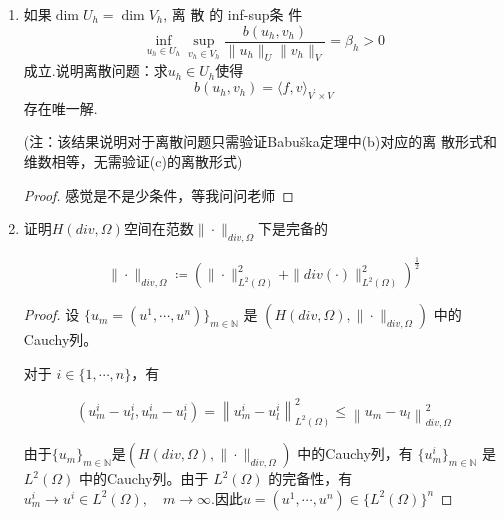 \documentclass[12pt,a4paper]{article}
\begin{document}
\begin{enumerate}
\begin{proof}
			在$\eqref{eq2}$中令$w=u$,则有
			$$\sup\limits_{v\in V}\frac{b(u,v)}{||v||_V}\geq\frac{b(u,\lambda)}{||\lambda||_V}=\frac{(u,u)}{||\lambda||_V}\geq\beta||u||_U,$$
			从而$B:U^{\perp}\to V^{\prime}$满足Babuška定理的三个条件，故$B$是一个同构映射.
			
			(3) $\Rightarrow$ (1):
			
			因 (3) 成立，故$B:U^\perp\to V^{\prime}$是一个同构，对给定的$v\in V$,
			$$\begin{aligned}||v||_{V}&=\sup_{g\in V^{\prime}}\frac{\langle g,v\rangle}{||g||_{V^{\prime}}}=\sup_{u\in U^{\perp}}\frac{\langle Bu,v\rangle}{||Bu||_{V^{\prime}}}\\&=\sup_{u\in U^{\perp}}\frac{b(u,v)}{||Bu||_{V^{\prime}}}\leq\sup_{u\in U^{\perp}}\frac{b(u,v)}{\beta||u||_{U}}\leq\frac{1}{\beta}\sup_{u\in U}\frac{b(u,v)}{||u||_{U}},\end{aligned}$$
			从而 (1)成立，证毕.
			
			
		\end{proof}
		\item 如果$\dim U_h= \dim V_h$, 离 散 的 inf-sup条 件 
		$$\inf_{u_h\in U_h}\sup_{v_h\in V_h}\frac{b(u_h,v_h)}{\|u_h\|_U\|v_h\|_V}=\beta_h>0$$
		成立.说明离散问题：求$u_h\in U_h$使得
		$$b(u_h,v_h)=\langle f,v\rangle_{V^{\prime}\times V}$$
		存在唯一解.
		
		(注：该结果说明对于离散问题只需验证Babuška定理中(b)对应的离
		散形式和维数相等，无需验证(c)的离散形式) 
		
		\begin{proof}
			感觉是不是少条件，等我问问老师
		\end{proof}
		\item 证明$H(div,\Omega)$空间在范数$\|\cdot\|_{div,\Omega}$下是完备的
		
		$$\|\cdot\|_{div,\Omega} \coloneqq (\|\cdot\|_{L^2(\Omega)}^2 + \|div(\cdot)\|_{L^2(\Omega)}^2)^{\frac{1}{2}}$$
		
		\begin{proof}
			设 $\{u_m=(u^1,\cdots,u^n)\}_{m\in\mathbb{N}}$ 是 $(H(div,\Omega),\|\cdot\|_{div,\Omega})$ 中的Cauchy列。
			
			对于 $i\in\{1,\cdots,n\}$，有
			
			$$(u_m^i-u_l^i,u_m^i-u_l^i)=\left\|u_m^i-u_l^i\right\|_{L^2(\Omega)}^2\leq\left\|u_m-u_l\right\|_{div,\Omega}^2$$
			
			由于$\{u_m\}_{m\in\mathbb{N}}$是$(H(div,\Omega),\|\cdot\|_{div,\Omega})$ 中的Cauchy列，有 $\{u_m^i\}_{m\in\mathbb{N}}$ 是 $L^2(\Omega)$ 中的Cauchy列。由于 $L^2(\Omega)$ 的完备性，有 $u_m^i\to u^i\in L^2(\Omega), \quad m\to\infty$.因此$u=(u^1,\cdots,u^n)\in\{L^2(\Omega)\}^n$
			

\end{proof}
\end{enumerate}
\end{document}
